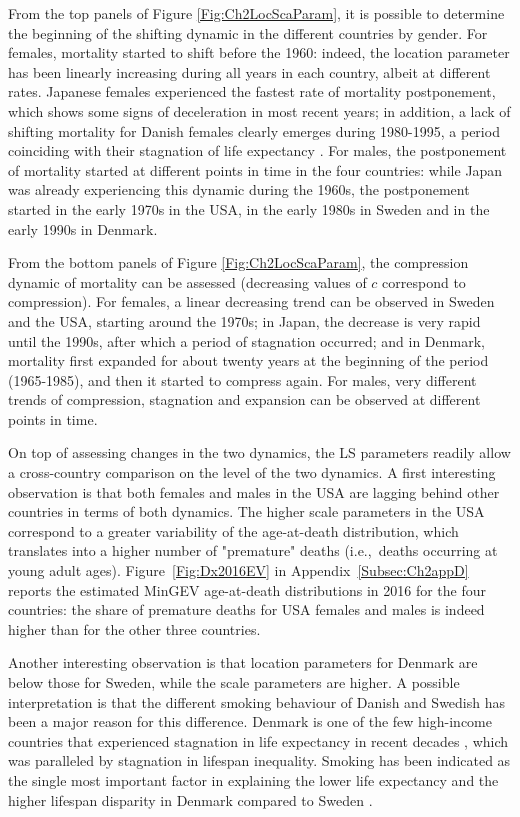 \documentclass[Thesis]{subfiles}
\begin{document}
From the top panels of Figure \ref{Fig:Ch2LocScaParam}, it is possible to determine the beginning of the shifting dynamic in the different countries by gender. For females, mortality started to shift before the 1960: indeed, the location parameter has been linearly increasing during all years in each country, albeit at different rates. Japanese females experienced the fastest rate of mortality postponement, which shows some signs of deceleration in most recent years; in addition, a lack of shifting mortality for Danish females clearly emerges during 1980-1995, a period coinciding with their stagnation of life expectancy \citep{christensen2010divergent,lindahl2016did,lindahl2016rise}. For males, the postponement of mortality started at different points in time in the four countries: while Japan was already experiencing this dynamic during the 1960s, the postponement started in the early 1970s in the USA, in the early 1980s in Sweden and in the early 1990s in Denmark.

From the bottom panels of Figure \ref{Fig:Ch2LocScaParam}, the compression dynamic of mortality can be assessed (decreasing values of $c$ correspond to compression). For females, a linear decreasing trend can be observed in Sweden and the USA, starting around the 1970s; in Japan, the decrease is very rapid until the 1990s, after which a period of stagnation occurred; and in Denmark, mortality first expanded for about twenty years at the beginning of the period (1965-1985), and then it started to compress again. For males, very different trends of compression, stagnation and expansion can be observed at different points in time. 

On top of assessing changes in the two dynamics, the LS parameters readily allow a cross-country comparison on the level of the two dynamics. A first interesting observation is that both females and males in the USA are lagging behind other countries in terms of both dynamics. The higher scale parameters in the USA correspond to a greater variability of the age-at-death distribution, which translates into a higher number of "premature" deaths (i.e.,~deaths occurring at young adult ages). Figure~\ref{Fig:Dx2016EV} in Appendix~\ref{Subsec:Ch2appD} reports the estimated MinGEV age-at-death distributions in 2016 for the four countries: the share of premature deaths for USA females and males is indeed higher than for the other three countries.

Another interesting observation is that location parameters for Denmark are below those for Sweden, while the scale parameters are higher. A possible interpretation is that the different smoking behaviour of Danish and Swedish has been a major reason for this difference. Denmark is one of the few high-income countries that experienced stagnation in life expectancy in recent decades \citep{lindahl2016rise}, which was paralleled by stagnation in lifespan inequality. Smoking has been indicated as the single most important factor in explaining the lower life expectancy  \citep{sun1994levetiden,lindahl2016did,jacobsen2004women,jacobsen2006causes} and the higher lifespan disparity in Denmark compared to Sweden \citep{aburto2018potential}.
\end{document}
